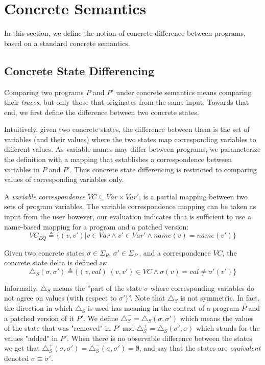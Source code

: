 \section{Concrete Semantics}
In this section, we define the notion of concrete difference between programs, based on a standard concrete semantics.

\subsection{Concrete State Differencing}
Comparing two programs $P$ and $P'$ under concrete semantics means comparing their \emph{traces}, but only those that originates from the same input. Towards that end, we first define the difference between two concrete states.

Intuitively, given two concrete states, the difference between them is the set of variables (and their values) where the two states map corresponding variables to different values. As variable names may differ between programs, we parameterize the definition with a mapping that establishes a correspondence between variables in $P$ and $P'$. Thus concrete state differencing is restricted to comparing values of corresponding variables only.

\begin{definition} 
A \emph{variable correspondence} $VC \subseteq Var \times Var'$, is a partial mapping between two sets of program variables. The variable correspondence mapping can be taken as input from the user however, our evaluation indicates that is sufficient to use a name-based mapping for a program and a patched version:
\[
VC_{EQ} \triangleq \{(v,v') | v \in Var \wedge v' \in Var' \wedge name(v) = name(v')\}
\]
\end{definition}

\begin{definition} 
Given two concrete states $\sigma \in \Sigma_{P}$, $\sigma' \in \Sigma_{P'}$, and a correspondence $VC$, the concrete state delta is defined as:
\[
\triangle_{S}(\sigma,\sigma') \triangleq \{ (v,val) | (v,v') \in VC \wedge \sigma(v) = val \neq \sigma'(v')\}
\]
\end{definition}
Informally, $\triangle_{S}$ means the ''part of the state $\sigma$ where corresponding variables do not agree on values (with respect to $\sigma'$)''. Note that $\triangle_{S}$ is not symmetric. In fact, the direction in which $\triangle_{S}$ is used has meaning in the context of a program $P$ and a patched version of it $P'$. We define $\triangle_{S}^{-} = \triangle_{S}(\sigma,\sigma')$ which means the values of the state that was "removed" in $P'$ and $\triangle_{S}^{+} = \triangle_{S}(\sigma',\sigma)$ which stands for the values "added" in $P'$. When there is no observable difference between the states we get that $\triangle_{S}^{+}(\sigma,\sigma')= \triangle_{S}^{-}(\sigma,\sigma') = \emptyset$, and say that the states are \emph{equivalent} denoted $\sigma \equiv \sigma'$.

